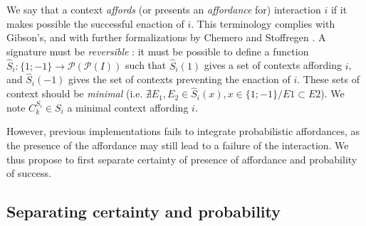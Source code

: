 \documentclass[conference]{IEEEtran}
\begin{document}
We say that a context \textit{affords} (or presents an \textit{affordance} for) interaction $i$ if it makes possible the successful enaction of $i$. 
This terminology complies with Gibson's, and with further formalizations by Chemero \cite{chemero:affordance} and Stoffregen \cite{stoffregen:affordance}.
A signature must be \textit{reversible} : it must be possible to define a function $\hat{S}_i : \{1;-1\} \rightarrow \mathcal{P}(\mathcal{P}(I))$ such that $\hat{S}_i(1)$ gives a set of contexts affording $i$, and $\hat{S}_i(-1)$ gives the set of contexts preventing the enaction of $i$.
These sets of context should be \textit{minimal} (i.e. $\nexists E_1,\!E_2\!\in\!\hat{S}_i(x), x\!\in\!\{1;-1\} / E1\!\subset\!E2$). 
We note $C_k^{S_i} \in S_i$ a minimal context affording $i$.




However, previous implementations fails to integrate probabilistic affordances, as the presence of the affordance may still lead to a failure of the interaction. We thus propose to first separate certainty of presence of affordance and probability of success.



\subsection{Separating certainty and probability}\label{AA}
\end{document}
